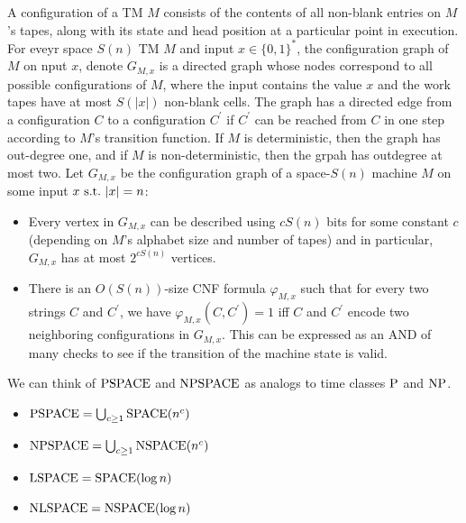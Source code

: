 \begin{note}
  A configuration of a TM $M$ consists of the contents of all non-blank
  entries on $M$'s tapes, along with its state and head position at a
  particular point in execution.
  For eveyr space $S(n)$ TM $M$ and input $x \in \{0, 1\}^\ast$, the
  configuration graph of $M$ on nput $x$, denote $G_{M, x}$ is a directed
  graph whose nodes correspond to all possible configurations of $M$, where
  the input contains the value $x$ and the work tapes have at most $S(|x|)$
  non-blank cells.
  The graph has a directed edge from a configuration $C$ to a configuration
  $C^\prime$ if $C^\prime$ can be reached from $C$ in one step according
  to $M$'s transition function.
  If $M$ is deterministic, then the graph has out-degree one, and if $M$
  is non-deterministic, then the grpah has outdegree at most two.
  Let $G_{M, x}$ be the configuration graph of a space-$S(n)$ machine $M$ on
  some input $x \mathrm{\ s.t.\ } |x| = n$:
  \begin{itemize}
    \item
      Every vertex in $G_{M, x}$ can be described using $cS(n)$ bits for some
      constant $c$ (depending on $M$'s alphabet size and number of tapes) and
      in particular, $G_{M, x}$ has at most $2^{cS(n)}$ vertices.

    \item
      There is an $O(S(n))$-size CNF formula $\varphi_{M, x}$ such that
      for every two strings $C$ and $C^\prime$, we have
      $\varphi_{M, x} (C, C^\prime) = 1$ iff $C$ and $C^\prime$ encode two
      neighboring configurations in $G_{M, x}$.
      This can be expressed as an AND of many checks to see if the transition
      of the machine state is valid.
  \end{itemize}
\end{note}

\begin{note}
  We can think of $\mathrm{PSPACE}$ and $\mathrm{NPSPACE}$ as analogs to time
  classes $\mathrm{P}$ and $\mathrm{NP}$.

  \begin{itemize}
    \item
      $\mathrm{PSPACE} = \bigcup_{c \geq 1} \mathrm{SPACE}(n^c)$

    \item
      $\mathrm{NPSPACE} = \bigcup_{c \geq 1} \mathrm{NSPACE}(n^c)$

    \item
      $\mathrm{LSPACE} = \mathrm{SPACE}(\log n)$

    \item
      $\mathrm{NLSPACE} = \mathrm{NSPACE}(\log n)$
  \end{itemize}
\end{note}

